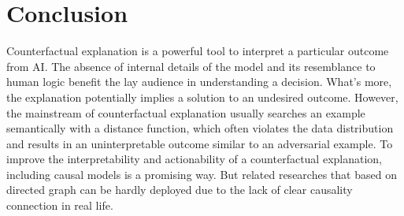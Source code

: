 \section{Conclusion}\label{sec:Conclude}
Counterfactual explanation is a powerful tool to interpret a particular outcome from AI. The absence of internal details of the model and its resemblance to human logic benefit the lay audience in understanding a decision. What's more, the explanation potentially implies a solution to an undesired outcome. However, the mainstream of counterfactual explanation usually searches an example semantically with a distance function, which often violates the data distribution and results in an uninterpretable outcome similar to an adversarial example. To improve the interpretability and actionability of a counterfactual explanation, including causal models is a promising way. But related researches that based on directed graph can be hardly deployed due to the lack of clear causality connection in real life.    